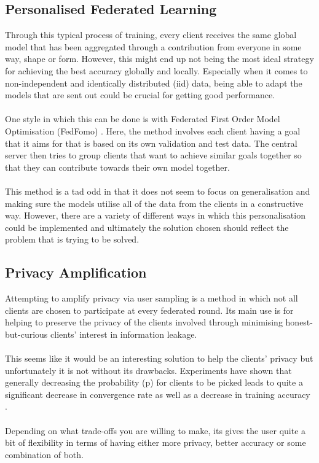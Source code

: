 \subsection{Personalised Federated Learning}
Through this typical process of training, every client receives the same global model that has been aggregated through a contribution from everyone in some way, shape or form.
However, this might end up not being the most ideal strategy for achieving the best accuracy globally and locally.
Especially when it comes to non-independent and identically distributed (iid) data, being able to adapt the models that are sent out could be crucial for getting good performance.
\\ \\
One style in which this can be done is with Federated First Order Model Optimisation (FedFomo) \cite{fedfomo}.
Here, the method involves each client having a goal that it aims for that is based on its own validation and test data.
The central server then tries to group clients that want to achieve similar goals together so that they can contribute towards their own model together.
\\ \\
This method is a tad odd in that it does not seem to focus on generalisation and making sure the models utilise all of the data from the clients in a constructive way.
However, there are a variety of different ways in which this personalisation could be implemented and ultimately the solution chosen should reflect the problem that is trying to be solved.


\subsection{Privacy Amplification}
Attempting to amplify privacy via user sampling is a method in which not all clients are chosen to participate at every federated round.
Its main use is for helping to preserve the privacy of the clients involved through minimising honest-but-curious clients' interest in information leakage.
\\ \\
This seems like it would be an interesting solution to help the clients' privacy but unfortunately it is not without its drawbacks.
Experiments have shown that generally decreasing the probability (p) for clients to be picked leads to quite a significant decrease in convergence rate as well as a decrease in training accuracy \cite{privamp}.
\\ \\
Depending on what trade-offs you are willing to make, its gives the user quite a bit of flexibility in terms of having either more privacy, better accuracy or some combination of both.



